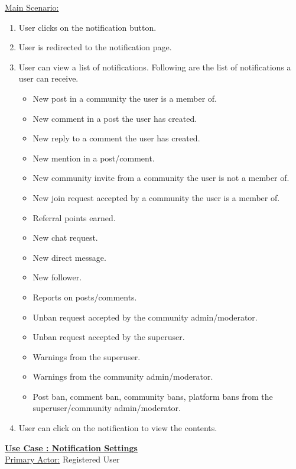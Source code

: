 \documentclass[conference,compsoc]{IEEEtran}
\newcounter{UC}
\newcommand{\nextU}{\stepcounter{UC}\theUC}
\begin{document}
\underline{Main Scenario:}\\
\begin{enumerate}
    \item User clicks on the notification button.
    \item User is redirected to the notification page.
    \item User can view a list of notifications. Following are the list of notifications a user can receive.
          \begin{itemize}
              \item New post in a community the user is a member of.
              \item New comment in a post the user has created.
              \item New reply to a comment the user has created.
              \item New mention in a post/comment.
              \item New community invite from a community the user is not a member of.
              \item New join request accepted by a community the user is a member of.
              \item Referral points earned.
              \item New chat request.
              \item New direct message.
              \item New follower.
              \item Reports on posts/comments.
              \item Unban request accepted by the community admin/moderator.
              \item Unban request accepted by the superuser.
              \item Warnings from the superuser.
              \item Warnings from the community admin/moderator.
              \item Post ban, comment ban, community bans, platform bans from the superuser/community admin/moderator.
          \end{itemize}
    \item User can click on the notification to view the contents.
\end{enumerate}

\underline{\textbf{Use Case \nextU: Notification Settings}}\\

\underline{Primary Actor:} Registered User\\
\end{document}
